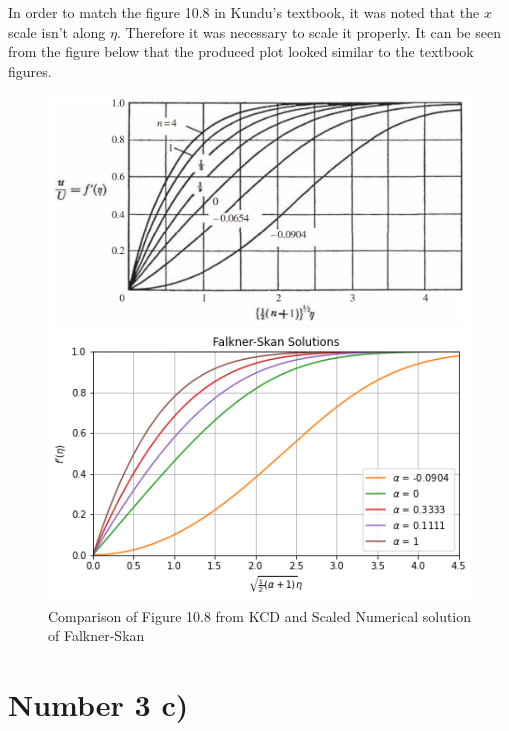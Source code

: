 \documentclass{article}
\begin{document}
		In order to match the figure 10.8 in Kundu's textbook, it was noted that the $x$ scale isn't along $\eta$. Therefore it was necessary to scale it properly. It can be seen from the figure below that the produced plot looked similar to the textbook figures. 
	
		\begin{figure}[H]
			\centering
			\begin{minipage}[b]{0.48\textwidth}
				\includegraphics[width=\textwidth]{images/etaOG.png}
			\end{minipage}
			\hfill
			\begin{minipage}[b]{0.42\textwidth}
				\includegraphics[width=\textwidth]{images/etaTwo.png}
			\end{minipage}
			\caption{ Comparison of Figure 10.8 from KCD and Scaled Numerical solution of Falkner-Skan  }
		\end{figure}
		
	\section*{Number 3 c)}
	
\end{document}
